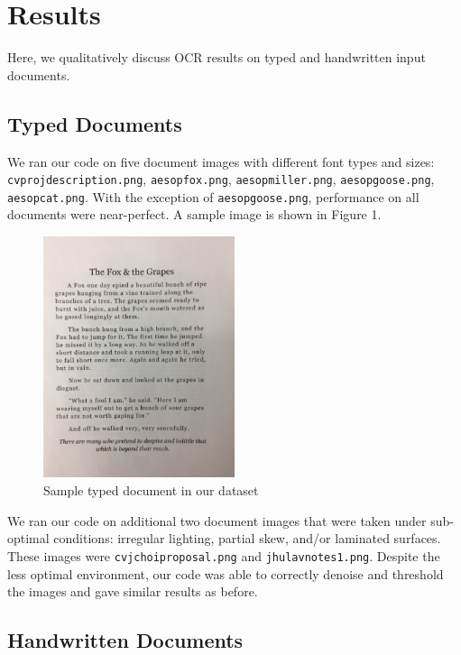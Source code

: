 \documentclass[11pt,letterpaper]{article}
\begin{document}
\section{Results}

Here, we qualitatively discuss OCR results on typed and handwritten input documents.

\subsection{Typed Documents}

We ran our code on five document images with different font types and sizes: {\tt cv\textunderscore proj\textunderscore description.png}, {\tt aesop\textunderscore fox.png}, {\tt aesop\textunderscore miller.png}, {\tt aesop\textunderscore goose.png}, {\tt aesop\textunderscore cat.png}. With the exception of {\tt aesop\textunderscore goose.png}, performance on all documents were near-perfect. A sample image is shown in Figure 1.

\begin{figure}[t!]
  \centering
  \includegraphics[keepaspectratio, width=0.5\textwidth]{fox.png}
  \caption{Sample typed document in our dataset}
\end{figure}

We ran our code on additional two document images that were taken under sub-optimal conditions: irregular lighting, partial skew, and/or laminated surfaces. These images were {\tt cv\textunderscore jchoi\textunderscore proposal.png} and {\tt jhu\textunderscore lav\textunderscore notes1.png}. Despite the less optimal environment, our code was able to correctly denoise and threshold the images and gave similar results as before.

\subsection{Handwritten Documents}
\end{document}
